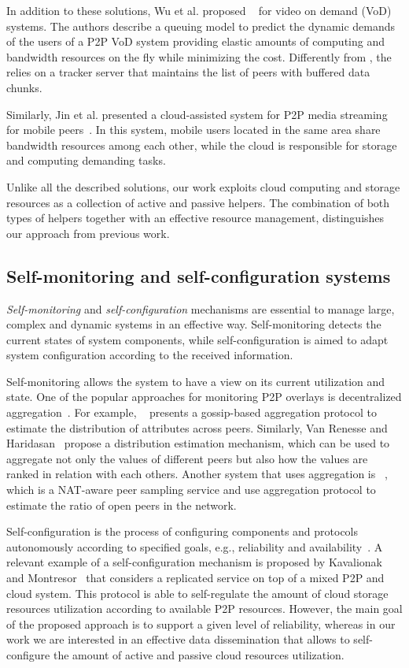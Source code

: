 {In addition to these solutions, Wu et al. proposed \cloudmedia~\cite{cloudmedia} for video on demand (VoD) systems. The authors describe a queuing model to predict the dynamic demands of the users of a P2P
VoD system providing elastic amounts of computing and bandwidth resources on the fly while minimizing the cost. Differently from \clive, the \cloudmedia relies on a tracker server that maintains the list of peers with buffered data chunks.

Similarly, Jin et al. presented a cloud-assisted system for P2P media streaming for
mobile peers~\cite{mobilecloud}. In this system, mobile users located in the same area share bandwidth resources among each other, while the cloud is responsible for storage and computing demanding tasks.


Unlike all the described solutions, our work exploits cloud computing and storage resources
as a collection of active and passive helpers. The combination of both types
of helpers together with an effective resource management, distinguishes our
approach from previous work.

\subsection{Self-monitoring and self-configuration systems}

\emph{Self-monitoring} and \emph{self-configuration} mechanisms are essential
to manage large, complex and dynamic systems in an effective way.
Self-monitoring detects the current states of system components, while
self-configuration is aimed to adapt system configuration according to the
received information.

Self-monitoring allows the system to have a view on its current utilization
and state. One of the popular approaches for monitoring P2P overlays is
decentralized aggregation~\cite{aggregation}. For example, \adam~\cite{adam2}
presents a gossip-based aggregation protocol to estimate the distribution of
attributes across peers. Similarly, Van Renesse and
Haridasan~\cite{gossipestimation} propose a distribution estimation mechanism,
which can be used to aggregate not only the values of different peers but also
how the values are ranked in relation with each others. Another system that
uses aggregation is \croupier~\cite{croupier}, which is a NAT-aware peer
sampling service and use aggregation protocol to estimate the ratio of open
peers in the network.

Self-configuration is the process of configuring components and
protocols autonomously according to specified goals, e.g., reliability and
availability~\cite{amoretti_autonomous,self,tman,kavalionak:iwsos12}. A relevant example of a
self-configuration mechanism is proposed by Kavalionak and
Montresor~\cite{kavalionak:iwsos12} that considers a replicated service on top of
a mixed P2P and cloud system. This protocol is able to self-regulate the
amount of cloud storage resources utilization according to available P2P
resources. However, the main goal of the proposed approach is to support a
given level of reliability, whereas in our work we are interested in an
effective data dissemination that allows to self-configure the amount of
active and passive cloud resources utilization.

}
